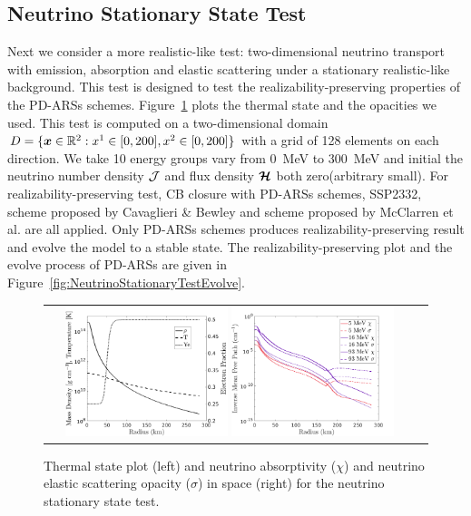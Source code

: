 \subsection{Neutrino Stationary State Test} \label{se: Neutrino Stationary State Test}
Next we consider a more realistic-like test: two-dimensional neutrino transport with emission, absorption and elastic scattering under a stationary realistic-like background.
This test is designed to test the realizability-preserving properties of the PD-ARSs schemes.
Figure~\ref{fig:NeutrinoStationaryTestEOS} plots the thermal state and the opacities we used.
This test is computed on a two-dimensional domain $D=\{\boldsymbol{x}\in\mathbb{R}^{2}:x^{1}\in[0,200], x^{2}\in[0,200]\}$ with a grid of 128 elements on each direction.
We take 10 energy groups vary from 0~MeV to 300~MeV and initial the neutrino number density $\mathcal{J}$ and flux density $\boldsymbol{\mathcal{H}}$ both zero(arbitrary small).
For realizability-preserving test, CB closure with PD-ARSs schemes, SSP2332, scheme proposed by Cavaglieri \& Bewley \cite{cavaglieriBewley2015} and scheme proposed by McClarren et al. \cite{mcclarren_etal_2008} are all applied.
Only PD-ARSs schemes produces realizability-preserving result and evolve the model to a stable state.
The realizability-preserving plot and the evolve process of PD-ARSs are given in Figure~\ref{fig:NeutrinoStationaryTestEvolve}. 

\begin{figure}[h]
  \centering
  \begin{tabular}{cc}
    \includegraphics[width=0.45\textwidth]{figures/NStatinaryS_EOS}
    \includegraphics[width=0.45\textwidth]{figures/NSS_Opacities}
  \end{tabular}
   \caption{Thermal state plot (left) and neutrino absorptivity ($\chi$) and neutrino elastic scattering opacity ($\sigma$) in space (right) for the neutrino stationary state test.}
   \label{fig:NeutrinoStationaryTestEOS}
\end{figure}

